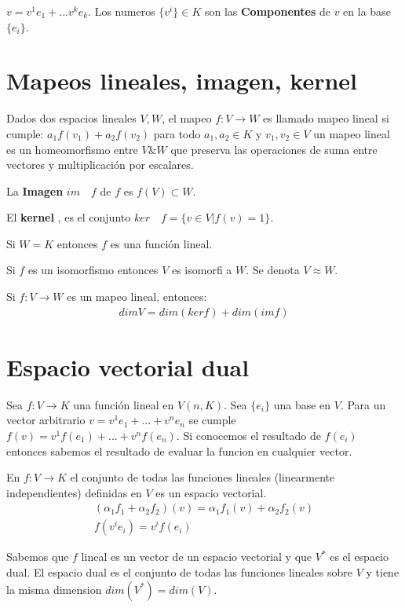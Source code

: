 \documentclass{article}
\newcommand{\caja}[3]{%
  \begin{tcolorbox}[colback=#1!5!white,colframe=#1!25!black,title=#2]
    #3
  \end{tcolorbox}%
}
\begin{document}
$ v = v ^ {1 }e_ 1 + ... v ^ {k }e_k  $. Los numeros $ \{v ^ {i }\} \in K $ son las \textbf{Componentes } de $ v  $ en la base $ \{e_i \} $.

\section{Mapeos lineales, imagen, kernel }
Dados dos espacios lineales $ V,W  $, el mapeo $ f: V \rightarrow W  $ es llamado mapeo lineal si cumple: $ a_1 f(v_1) + a_2 f(v_ 2) $ para todo $ a_1,a_2 \in K  $ y $ v_1, v_2 \in V  $ un mapeo lineal es un homeomorfismo entre $ V \& W $ que preserva las operaciones de suma entre vectores y multiplicación por escalares. 

La \textbf{Imagen } $ im \quad f  $ de $ f  $ es $ f(V) \subset W  $. 

El \textbf{kernel }, es el conjunto $ ker\quad f = \{v \in V |f(v)=1 \} $. 

Si $ W=K  $ entonces $ f  $ es una función lineal. 

Si $ f  $ es un isomorfismo entonces $ V $ es isomorfi a $ W  $. Se denota $ V \approx W  $.

\caja{green}{Teorema }{
  Si $ f: V \rightarrow W  $ es un mapeo lineal, entonces: 
  \begin{gather*}
    dim V = dim(ker f) + dim(im f) 
  \end{gather*}
}

\section{Espacio vectorial dual }
Sea $ f: V \rightarrow K  $ una función lineal en $ V(n,K) $. Sea $ \{e_i \} $ una base en $ V  $. Para un vector arbitrario $ v = v ^ {1 }e_1 +... + v ^ {n }e _{n }  $ se cumple $ f(v) = v ^ {1 }f (e_1) + ... + v ^ {n }f(e_n ) $. Si conocemos el resultado de $ f(e_i ) $ entonces sabemos el resultado de evaluar la funcion en cualquier vector. 

En $ f: V \rightarrow K    $ el conjunto de todas las funciones lineales (linearmente independientes) definidas en $ V  $ es un espacio vectorial. 
\begin{gather*}
  (\alpha_1 f_1 + \alpha_2 f_2 )(v) = \alpha_1 f_1 (v) + \alpha_2 f_2(v)\\
  f(v ^ {i }e_i ) = v ^ {i }f ( e_i )
\end{gather*}

Sabemos que $ f  $ lineal es un vector de un espacio vectorial y que $ V ^ {* } $ es el espacio dual. El espacio dual es el conjunto de todas las funciones lineales sobre $ V  $ y tiene la misma dimension $ dim(V^*) = dim(V) $.
\end{document}
